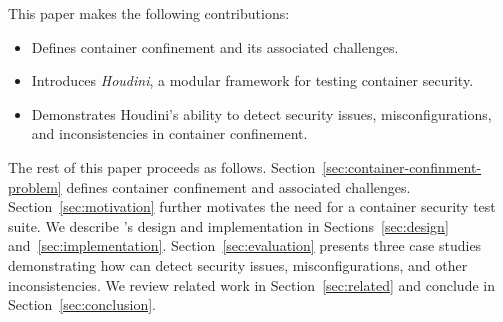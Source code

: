


This paper makes the following contributions:
\begin{itemize}
    \item Defines container confinement and its associated challenges.
    \item Introduces \textit{Houdini}, a modular framework for testing container security.
    \item Demonstrates Houdini’s ability to detect security issues, misconfigurations, and inconsistencies in container confinement.
\end{itemize}

The rest of this paper proceeds as follows. Section~\ref{sec:container-confinment-problem} defines container confinement and associated challenges. Section~\ref{sec:motivation} further motivates the need for a container security test suite. We describe \houdini's design and implementation in Sections~\ref{sec:design} and~\ref{sec:implementation}. Section~\ref{sec:evaluation} presents three case studies demonstrating how \houdini can detect security issues, misconfigurations, and other inconsistencies. We review related work in Section~\ref{sec:related} and conclude in Section~\ref{sec:conclusion}.
